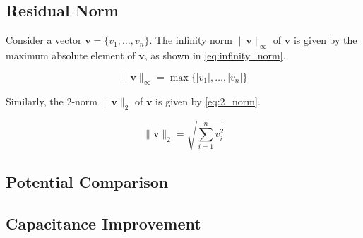 \documentclass[a4paper,titlepage]{article}
\begin{document}
	\subsection{Residual Norm}
	
	Consider a vector $\textbf{v} = \{v_1, \ldots, v_n\}$. The infinity norm $\|\textbf{v}\|_\infty$ of $\textbf{v}$ is given by the maximum absolute element of $\textbf{v}$, as shown in \cref{eq:infinity_norm}.
	
	\begin{equation} \label{eq:infinity_norm}
		\|\textbf{v}\|_\infty = \max\{|v_1|, \ldots, |v_n|\}
	\end{equation}
	
	Similarly, the 2-norm $\|\textbf{v}\|_2$ of $\textbf{v}$ is given by \cref{eq:2_norm}.
	
	\begin{equation} \label{eq:2_norm}
		\|\textbf{v}\|_2 = \sqrt{\sum_{i = 1}^{n} v_i^2}
	\end{equation}
	
	\subsection{Potential Comparison}
	
	\subsection{Capacitance Improvement}
	
%
	
	\onecolumn
	
\end{document}
